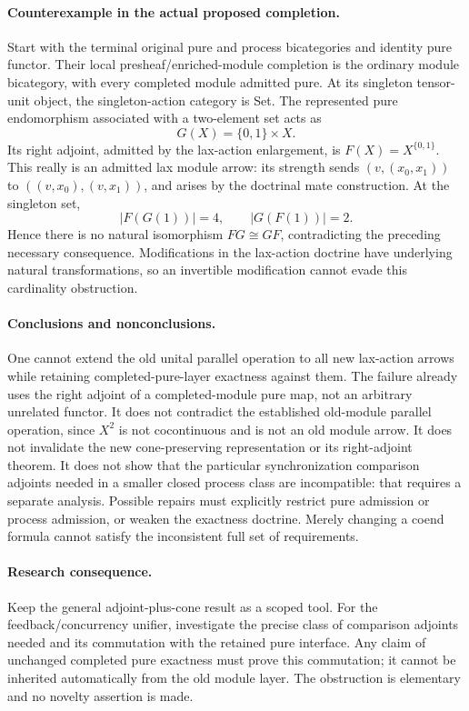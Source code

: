 \documentclass{article}
\begin{document}
\paragraph{Counterexample in the actual proposed completion.} Start with the terminal original pure and process bicategories and identity pure functor. Their local presheaf/enriched-module completion is the ordinary module bicategory, with every completed module admitted pure. At its singleton tensor-unit object, the singleton-action category is Set. The represented pure endomorphism associated with a two-element set acts as
\[
 G(X)=\{0,1\}\times X.
\]
Its right adjoint, admitted by the lax-action enlargement, is $F(X)=X^{\{0,1\}}$. This really is an admitted lax module arrow: its strength sends $(v,(x_0,x_1))$ to $((v,x_0),(v,x_1))$, and arises by the doctrinal mate construction. At the singleton set,
\[
 |F(G(1))|=4,\qquad |G(F(1))|=2.
\]
Hence there is no natural isomorphism $FG\cong GF$, contradicting the preceding necessary consequence. Modifications in the lax-action doctrine have underlying natural transformations, so an invertible modification cannot evade this cardinality obstruction.

\paragraph{Conclusions and nonconclusions.} One cannot extend the old unital parallel operation to all new lax-action arrows while retaining completed-pure-layer exactness against them. The failure already uses the right adjoint of a completed-module pure map, not an arbitrary unrelated functor. It does not contradict the established old-module parallel operation, since $X^2$ is not cocontinuous and is not an old module arrow. It does not invalidate the new cone-preserving representation or its right-adjoint theorem. It does not show that the particular synchronization comparison adjoints needed in a smaller closed process class are incompatible: that requires a separate analysis. Possible repairs must explicitly restrict pure admission or process admission, or weaken the exactness doctrine. Merely changing a coend formula cannot satisfy the inconsistent full set of requirements.

\paragraph{Research consequence.} Keep the general adjoint-plus-cone result as a scoped tool. For the feedback/concurrency unifier, investigate the precise class of comparison adjoints needed and its commutation with the retained pure interface. Any claim of unchanged completed pure exactness must prove this commutation; it cannot be inherited automatically from the old module layer. The obstruction is elementary and no novelty assertion is made.
\end{document}
